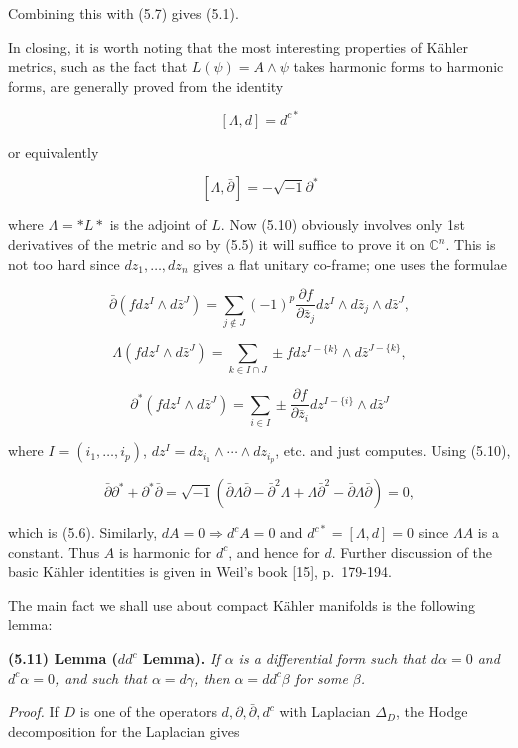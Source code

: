 \documentclass[
  english,
  a3paper,
  a3paper]{extarticle}
\begin{document}
Combining this with (5.7) gives (5.1).

In closing, it is worth noting that the most interesting properties of
Kähler metrics, such as the fact that \(L(\psi)=A\wedge\psi\) takes
harmonic forms to harmonic forms, are generally proved from the identity

\[\tag{5.9}[\Lambda,d]=d^{c*}\]

or equivalently

\[\tag{5.10}[\Lambda,\bar\partial]=-\sqrt{-1}\partial^*\]

where \(\Lambda=*L*\) is the adjoint of \(L\). Now (5.10) obviously
involves only 1st derivatives of the metric and so by (5.5) it will
suffice to prove it on \(\mathbb C^n\). This is not too hard since
\(dz_1,\ldots,dz_n\) gives a flat unitary co-frame; one uses the
formulae

\[\bar\partial(fdz^I\wedge d\bar z^J)=\sum_{j\notin J}(-1)^p\frac{\partial f}{\partial\bar z_j}dz^I\wedge d\bar z_j\wedge d\bar z^J,\]

\[\Lambda(fdz^I\wedge d\bar z^J)=\sum_{k\in I\cap J}\pm fdz^{I-\{k\}}\wedge d\bar z^{J-\{k\}},\]

\[\partial^*(fdz^I\wedge d\bar z^J)=\sum_{i\in I}\pm\frac{\partial f}{\partial\bar z_i}dz^{I-\{i\}}\wedge d\bar z^J\]

where \(I=(i_1,\ldots,i_p)\),
\(dz^I=dz_{i_1}\wedge\cdots\wedge dz_{i_p}\), etc. and just computes.
Using (5.10),

\[\bar\partial\partial^*+\partial^*\bar\partial=\sqrt{-1}(\bar\partial\Lambda\bar\partial-\bar\partial^2\Lambda+\Lambda\bar\partial^2-\bar\partial\Lambda\bar\partial)=0,\]

which is (5.6). Similarly, \(dA=0\Rightarrow d^cA=0\) and
\(d^{c*}=[\Lambda,d]=0\) since \(\Lambda A\) is a constant. Thus \(A\)
is harmonic for \(d^c\), and hence for \(d\). Further discussion of the
basic Kähler identities is given in Weil's book {[}15{]}, p.~179-194.

The main fact we shall use about compact Kähler manifolds is the
following lemma:

\textbf{(5.11) Lemma (\(dd^c\) Lemma).} \emph{If \(\alpha\) is a
differential form such that \(d\alpha=0\) and \(d^c\alpha=0\), and such
that \(\alpha=d\gamma\), then \(\alpha=dd^c\beta\) for some \(\beta\).}

\emph{Proof.} If \(D\) is one of the operators
\(d,\partial,\bar\partial,d^c\) with Laplacian \(\Delta_D\), the Hodge
decomposition for the Laplacian gives
\end{document}

